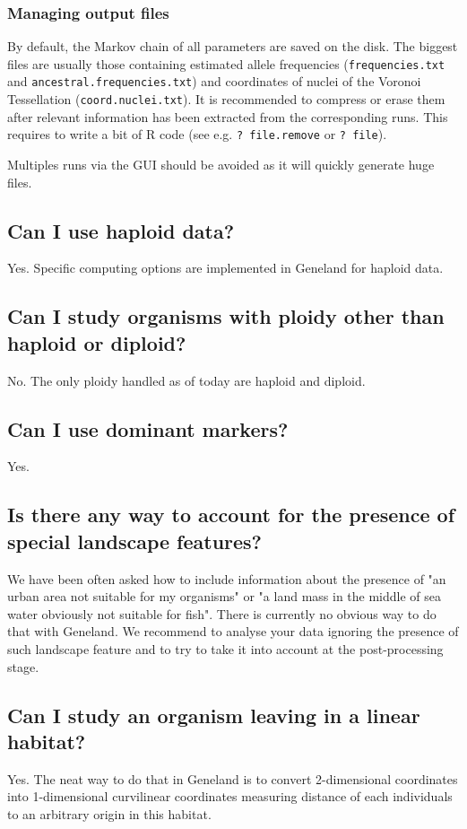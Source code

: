 \documentclass{article}
\begin{document}
\subsubsection{Managing output files}
By default, the Markov chain of all parameters are saved on the disk. The biggest files are usually those containing estimated allele 
frequencies (\texttt{frequencies.txt} and \texttt{ancestral.frequencies.txt}) and coordinates of nuclei of the Voronoi Tessellation 
(\texttt{coord.nuclei.txt}). It is recommended to compress or erase them after relevant information has been extracted from 
the corresponding runs. This requires to write a bit of R code  (see e.g. {\tt ? file.remove} or {\tt ? file}).

Multiples runs via the GUI should be avoided as it will quickly generate huge files.


\subsection{Can I use haploid data?}
Yes. Specific computing options are implemented in {\sc Geneland} for haploid data. 

\subsection[Unusual ploidies]{Can I study organisms with ploidy other than haploid or diploid?}
No. The only ploidy handled as of today are haploid and diploid. 

\subsection{Can I use dominant markers?}
Yes. 

\subsection[Special landscape features]{Is there any way to account for the presence of special landscape features?}
We have been often asked how to include information about the presence of "an urban area not suitable for my organisms" 
or "a land mass in the middle of sea water obviously not suitable for fish". 
There is currently no obvious way to do that with {\sc Geneland}. 
We recommend to analyse your data ignoring the presence of such landscape feature and to  try to take it into account 
at the post-processing stage. 

\subsection[Linear habitat]{Can I study an organism leaving in a linear habitat?}
Yes. The neat way to do that in {\sc Geneland} is to convert 2-dimensional coordinates into 1-dimensional curvilinear coordinates measuring distance 
of each individuals to an arbitrary origin in this habitat.
\end{document}
